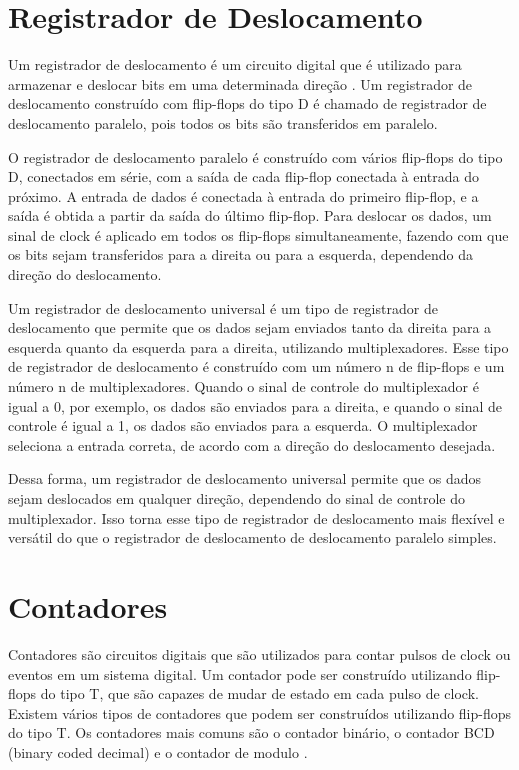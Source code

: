 \section{Registrador de Deslocamento}
Um registrador de deslocamento é um circuito digital que é utilizado para armazenar e deslocar bits em uma determinada direção \cite{tocci2010sistemas}. Um registrador de deslocamento construído com flip-flops do tipo D é chamado de registrador de deslocamento paralelo, pois todos os bits são transferidos em paralelo.

O registrador de deslocamento paralelo é construído com vários flip-flops do tipo D, conectados em série, com a saída de cada flip-flop conectada à entrada do próximo. A entrada de dados é conectada à entrada do primeiro flip-flop, e a saída é obtida a partir da saída do último flip-flop. Para deslocar os dados, um sinal de clock é aplicado em todos os flip-flops simultaneamente, fazendo com que os bits sejam transferidos para a direita ou para a esquerda, dependendo da direção do deslocamento.

Um registrador de deslocamento universal é um tipo de registrador de deslocamento que permite que os dados sejam enviados tanto da direita para a esquerda quanto da esquerda para a direita, utilizando multiplexadores. Esse tipo de registrador de deslocamento é construído com um número n de flip-flops e um número n de multiplexadores. Quando o sinal de controle do multiplexador é igual a 0, por exemplo, os dados são enviados para a direita, e quando o sinal de controle é igual a 1, os dados são enviados para a esquerda. O multiplexador seleciona a entrada correta, de acordo com a direção do deslocamento desejada.

Dessa forma, um registrador de deslocamento universal permite que os dados sejam deslocados em qualquer direção, dependendo do sinal de controle do multiplexador. Isso torna esse tipo de registrador de deslocamento mais flexível e versátil do que o registrador de deslocamento de deslocamento paralelo simples. 

\section{Contadores}
Contadores são circuitos digitais que são utilizados para contar pulsos de clock ou eventos em um sistema digital. Um contador pode ser construído utilizando flip-flops do tipo T, que são capazes de mudar de estado em cada pulso de clock. Existem vários tipos de contadores que podem ser construídos utilizando flip-flops do tipo T. Os contadores mais comuns são o contador binário, o contador BCD (binary coded decimal) e o contador de modulo \cite{floyd}.

